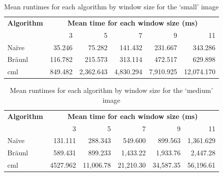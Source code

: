 \begin{table}
\centering
\caption[Mean runtimes for each algorithm for the `small' image]{Mean runtimes for each algorithm by window size for the `small' image}
\label{tab:median:small}
\begin{tabular}{@{}lrrrrr@{}}
\toprule
\multicolumn{1}{c}{\textbf{Algorithm}} & \multicolumn{5}{c}{\textbf{Mean time for each window size (ms)}}  \\
                              & 3       & 5         & 7         & 9         & 11         \\ \midrule
Naïve                         & 35.246  & 75.282    & 141.432   & 231.667   & 343.286    \\
Bräunl                        & 116.782 & 215.573   & 313.114   & 472.517   & 629.898    \\
\gls{cml}                           & 849.482 & 2,362.643 & 4,830.294 & 7,910.925 & 12,074.170 \\ \bottomrule
\end{tabular}
\end{table}

\begin{table}
\centering
\caption[Mean runtimes for each algorithm for the `medium' image]{Mean runtimes for each algorithm by window size for the `medium' image}
\label{tab:median:medium}
\begin{tabular}{@{}lrrrrr@{}}
\toprule
\multicolumn{1}{c}{\textbf{Algorithm}} & \multicolumn{5}{c}{\textbf{Mean time for each window size (ms)}}      \\
\multicolumn{1}{r}{}                   & \multicolumn{1}{r}{3} & 5         & 7         & 9         & 11        \\ \midrule
Naïve                                  & 131.111               & 288.343   & 549.600   & 899.563   & 1,361.629 \\
Bräunl                                 & 589.431
               & 899.233   & 1,433.22  & 1,933.76  & 2,447.28  \\
\gls{cml}                                    & 4527.962
               & 11,006.78 & 21,210.30 & 34,587.35 & 56,196.61 \\ \bottomrule
\end{tabular}
\end{table}

